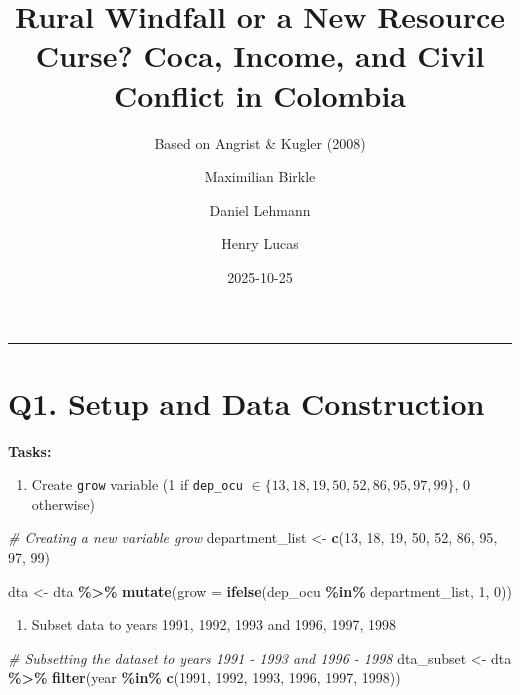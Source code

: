 \documentclass[
]{article}
\title{Rural Windfall or a New Resource Curse? Coca, Income, and Civil
Conflict in Colombia}
\subtitle{Based on Angrist \& Kugler (2008)}
\author{Maximilian Birkle \and Daniel Lehmann \and Henry Lucas}
\date{2025-10-25}
\newenvironment{Shaded}{\begin{snugshade}}{\end{snugshade}}
\newcommand{\AttributeTok}[1]{\textcolor[rgb]{0.13,0.29,0.53}{#1}}
\newcommand{\CommentTok}[1]{\textcolor[rgb]{0.56,0.35,0.01}{\textit{#1}}}
\newcommand{\DecValTok}[1]{\textcolor[rgb]{0.00,0.00,0.81}{#1}}
\newcommand{\FunctionTok}[1]{\textcolor[rgb]{0.13,0.29,0.53}{\textbf{#1}}}
\newcommand{\NormalTok}[1]{#1}
\newcommand{\OtherTok}[1]{\textcolor[rgb]{0.56,0.35,0.01}{#1}}
\newcommand{\SpecialCharTok}[1]{\textcolor[rgb]{0.81,0.36,0.00}{\textbf{#1}}}
\providecommand{\tightlist}{%
  \setlength{\itemsep}{0pt}\setlength{\parskip}{0pt}}
\begin{document}
\maketitle

{
\setcounter{tocdepth}{2}
\tableofcontents
}
\begin{center}\rule{0.5\linewidth}{0.5pt}\end{center}

\section{Q1. Setup and Data
Construction}\label{q1.-setup-and-data-construction}

\textbf{Tasks:}

\begin{enumerate}
\def\labelenumi{\arabic{enumi}.}
\tightlist
\item
  Create \texttt{grow} variable (1 if \texttt{dep\_ocu}
  \(\in \{13, 18, 19, 50, 52, 86, 95, 97, 99\}\), 0 otherwise)
\end{enumerate}

\begin{Shaded}
\begin{Highlighting}[]
\CommentTok{\# Creating a new variable grow}
\NormalTok{department\_list }\OtherTok{\textless{}{-}} \FunctionTok{c}\NormalTok{(}\DecValTok{13}\NormalTok{, }\DecValTok{18}\NormalTok{, }\DecValTok{19}\NormalTok{, }\DecValTok{50}\NormalTok{, }\DecValTok{52}\NormalTok{, }\DecValTok{86}\NormalTok{, }\DecValTok{95}\NormalTok{, }\DecValTok{97}\NormalTok{, }\DecValTok{99}\NormalTok{)}

\NormalTok{dta }\OtherTok{\textless{}{-}}\NormalTok{ dta }\SpecialCharTok{\%\textgreater{}\%} 
  \FunctionTok{mutate}\NormalTok{(}\AttributeTok{grow =} \FunctionTok{ifelse}\NormalTok{(dep\_ocu }\SpecialCharTok{\%in\%}\NormalTok{ department\_list, }\DecValTok{1}\NormalTok{, }\DecValTok{0}\NormalTok{))}
\end{Highlighting}
\end{Shaded}

\begin{enumerate}
\def\labelenumi{\arabic{enumi}.}
\setcounter{enumi}{1}
\tightlist
\item
  Subset data to years 1991, 1992, 1993 and 1996, 1997, 1998
\end{enumerate}

\begin{Shaded}
\begin{Highlighting}[]
\CommentTok{\# Subsetting the dataset to years 1991 {-} 1993 and 1996 {-} 1998}
\NormalTok{dta\_subset }\OtherTok{\textless{}{-}}\NormalTok{ dta }\SpecialCharTok{\%\textgreater{}\%} 
  \FunctionTok{filter}\NormalTok{(year }\SpecialCharTok{\%in\%} \FunctionTok{c}\NormalTok{(}\DecValTok{1991}\NormalTok{, }\DecValTok{1992}\NormalTok{, }\DecValTok{1993}\NormalTok{, }\DecValTok{1996}\NormalTok{, }\DecValTok{1997}\NormalTok{, }\DecValTok{1998}\NormalTok{))}
\end{Highlighting}
\end{Shaded}
\end{document}
